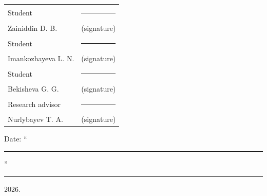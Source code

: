 \vspace{1cm}

\noindent
\begin{tabular}{@{}p{7cm}p{6cm}@{}}
Student & \rule{5cm}{0.4pt} \\
Zainiddin D. B. & \multicolumn{1}{c}{\footnotesize (signature)} \\[0.3cm]
Student & \rule{5cm}{0.4pt} \\
Imankozhayeva L. N. & \multicolumn{1}{c}{\footnotesize (signature)} \\[0.3cm]
Student & \rule{5cm}{0.4pt} \\
Bekisheva G. G. & \multicolumn{1}{c}{\footnotesize (signature)} \\[0.6cm]
Research advisor & \rule{5cm}{0.4pt} \\
Nurlybayev T. A. & \multicolumn{1}{c}{\footnotesize (signature)} \\
\end{tabular}

\vspace{0.6cm}

\noindent Date: ``\rule{1cm}{0.4pt}'' \rule{2cm}{0.4pt} 2026.

\newpage
